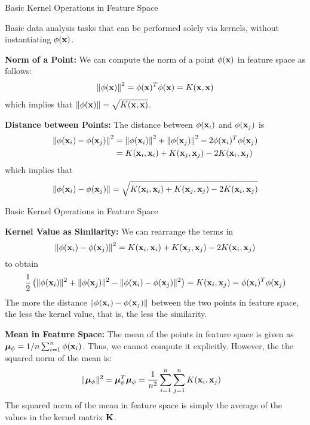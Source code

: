 \begin{frame}{Basic Kernel Operations in Feature Space}

  Basic data analysis tasks that can be
  performed solely via kernels, without instantiating $\phi(\mathbf{x})$.

\medskip
{\bf Norm of a Point:} We can compute the
norm of a point $\phi(\mathbf{x})$ in feature space as follows:
\begin{align*}
  \left\lVert\phi(\mathbf{x})\right\rVert^2 = \phi(\mathbf{x})^T\phi(\mathbf{x}) = K(\mathbf{x}, \mathbf{x})
\end{align*}
which implies that $\left\lVert\phi(\mathbf{x})\right\rVert = \sqrt{K(\mathbf{x}, \mathbf{x})}$.

\medskip
{\bf Distance between Points:}
The distance between $\phi(\mathbf{x}_i)$ and
$\phi(\mathbf{x}_{j})$ is
\begin{align*}
  \left\lVert\phi(\mathbf{x}_i) -\phi(\mathbf{x}_{j})\right\rVert^2 & = \left\lVert\phi(\mathbf{x}_i)\right\rVert^2 +
  \left\lVert\phi(\mathbf{x}_{j})\right\rVert^2 - 2
  \phi(\mathbf{x}_i)^T\phi(\mathbf{x}_{j})\\
    & = K(\mathbf{x}_i,\mathbf{x}_i) + K (\mathbf{x}_{j}, \mathbf{x}_{j}) - 2 K(\mathbf{x}_i,\mathbf{x}_{j})
\end{align*}
which implies that
\begin{align*}
  \left\lVert\phi(\mathbf{x}_i) -\phi(\mathbf{x}_{j})\right\rVert =
  \sqrt{K(\mathbf{x}_i,\mathbf{x}_i) + K (\mathbf{x}_{j}, \mathbf{x}_{j}) - 2 K(\mathbf{x}_i,\mathbf{x}_{j})}
\end{align*}
\end{frame}


\begin{frame}{Basic Kernel Operations in Feature Space}

  {\bf Kernel Value as Similarity:} We can rearrange the terms in
  $$\left\lVert\phi(\mathbf{x}_i) -\phi(\mathbf{x}_{j})\right\rVert^2 
  = K(\mathbf{x}_i,\mathbf{x}_i) + K (\mathbf{x}_{j}, \mathbf{x}_{j}) - 2
  K(\mathbf{x}_i,\mathbf{x}_{j})$$
  to obtain
\begin{align*}
{1 \over 2} \left(\|\phi(\mathbf{x}_i)\|^2 + \|\phi(\mathbf{x}_{j})\|^2 - \|
    \phi(\mathbf{x}_i)-\phi(\mathbf{x}_{j}) \|^2\right) =
K(\mathbf{x}_i,\mathbf{x}_{j}) = \phi(\mathbf{x}_i)^T\phi(\mathbf{x}_{j})
\end{align*}
\smallskip
The more the distance $\|\phi(\mathbf{x}_i)-\phi(\mathbf{x}_{j})\|$
between the two points in
feature space, the less the kernel
value, that is, the less the similarity.

\medskip
{\bf Mean in Feature Space:} 
The mean of the points in
feature space is given as ${\bm \mu}_\phi = 1/n \sum_{i=1}^n \phi(\mathbf{x}_i)$.
Thus, we cannot compute it explicitly. However, the 
the squared norm of the mean is:
\begin{align}
    \|{\bm \mu}_\phi\|^2 & = {\bm \mu}_\phi^T{\bm \mu}_\phi = 
    {1\over n^2} \sum_{i=1}^n \sum_{j=1}^n K(\mathbf{x}_i, \mathbf{x}_{j})
\end{align}
The squared norm of the mean in
feature space is simply the average of the values in the kernel
matrix $\mathbf{K}$.
\end{frame}


